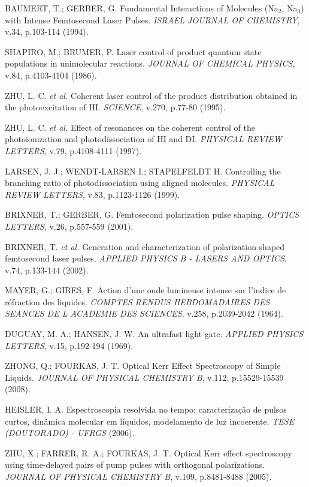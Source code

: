 \begin{thebibliography}{99}
 BAUMERT, T.; GERBER, G. Fundamental Interactions of Molecules (Na$_2$, Na$_3$) with Intense Femtosecond Laser Pulses. {\it ISRAEL JOURNAL OF CHEMISTRY}, v.34, p.103-114 (1994).

 SHAPIRO, M.; BRUMER, P. Laser control of product quantum state populations in unimolecular reactions. {\it JOURNAL OF CHEMICAL PHYSICS}, v.84, p.4103-4104 (1986).

 ZHU, L. C. {\it et al.} Coherent laser control of the product distribution obtained in the photoexcitation of HI. {\it SCIENCE}, v.270, p.77-80 (1995).

 ZHU, L. C. {\it et al.} Effect of resonances on the coherent control of the photoionization and photodissociation of HI and DI. {\it PHYSICAL REVIEW LETTERS}, v.79, p.4108-4111 (1997).

 LARSEN, J. J.; WENDT-LARSEN I.; STAPELFELDT H. Controlling the branching ratio of photodissociation using aligned molecules. {\it PHYSICAL REVIEW LETTERS}, v.83, p.1123-1126 (1999).

 BRIXNER, T.; GERBER, G. Femtosecond polarization pulse shaping. {\it OPTICS LETTERS}, v.26, p.557-559 (2001).

 BRIXNER, T. {\it et al.} Generation and characterization of polarization-shaped femtosecond laser pulses. {\it APPLIED PHYSICS B - LASERS AND OPTICS}, v.74, p.133-144 (2002).

 MAYER, G.; GIRES, F. Action d'une onde lumineuse intense sur l'indice de réfraction des liquides. {\it COMPTES RENDUS HEBDOMADAIRES DES SEANCES DE L ACADEMIE DES SCIENCES}, v.258, p.2039-2042 (1964).

 DUGUAY, M. A.; HANSEN, J. W. An ultrafast light gate. {\it APPLIED PHYSICS LETTERS}, v.15, p.192-194 (1969).

 ZHONG, Q.; FOURKAS, J. T. Optical Kerr Effect Spectroscopy of Simple Liquids. {\it JOURNAL OF PHYSICAL CHEMISTRY B}, v.112, p.15529-15539 (2008).

 HEISLER, I. A. Espectroscopia resolvida no tempo: caracterização de pulsos curtos, dinâmica molecular em líquidos, modelamento de luz incoerente. {\it TESE (DOUTORADO) - UFRGS} (2006).

 ZHU, X.; FARRER, R. A.; FOURKAS, J. T. Optical Kerr effect spectroscopy using time-delayed pairs of pump pulses with orthogonal polarizations. {\it JOURNAL OF PHYSICAL CHEMISTRY B}, v.109, p.8481-8488 (2005).


\end{thebibliography}
